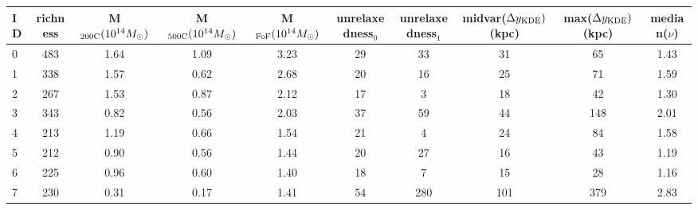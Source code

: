 \begin{tabular}{lccccccccc}
\toprule
ID & richness & M$_{\rm 200C} (10^{14} M_\odot)$ & M$_{\rm 500C} (10^{14}
M_\odot)$ & M$_{\rm FoF} (10^{14} M_\odot)$  & unrelaxedness$_0$ & unrelaxedness$_1$ & midvar($\Delta y_{\rm KDE})$ (kpc) & max($\Delta y_{\rm KDE})$ (kpc) & median($\nu$) \\
\midrule
 0 &      483 &                             1.64 &                             1.09 &                             3.23 &              29 &              33 &                                 31 &                              65 &       1.43 \\
 1 &      338 &                             1.57 &                             0.62 &                             2.68 &              20 &              16 &                                 25 &                              71 &       1.59 \\
 2 &      267 &                             1.53 &                             0.87 &                             2.12 &              17 &               3 &                                 18 &                              42 &       1.30 \\
 3 &      343 &                             0.82 &                             0.56 &                             2.03 &              37 &              59 &                                 44 &                             148 &       2.01 \\
 4 &      213 &                             1.19 &                             0.66 &                             1.54 &              21 &               4 &                                 24 &                              84 &       1.58 \\
 5 &      212 &                             0.90 &                             0.56 &                             1.44 &              20 &              27 &                                 16 &                              43 &       1.19 \\
 6 &      225 &                             0.96 &                             0.60 &                             1.40 &              18 &               7 &                                 15 &                              28 &       1.16 \\
 7 &      230 &                             0.31 &                             0.17 &                             1.41 &              54 &             280 &                                101 &                             379 &       2.83 \\

\end{tabular}
